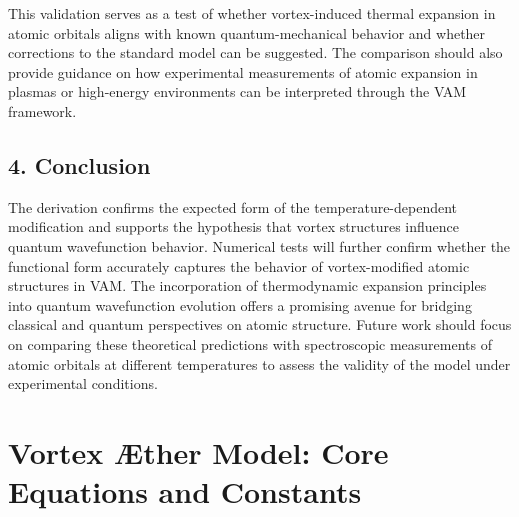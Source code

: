 \documentclass[a4paper,10pt]{article}
\begin{document}
This validation serves as a test of whether vortex-induced thermal expansion in atomic orbitals aligns with known quantum-mechanical behavior and whether corrections to the standard model can be suggested. The comparison should also provide guidance on how experimental measurements of atomic expansion in plasmas or high-energy environments can be interpreted through the VAM framework.

\subsection*{4. Conclusion}

The derivation confirms the expected form of the temperature-dependent modification and supports the hypothesis that vortex structures influence quantum wavefunction behavior. Numerical tests will further confirm whether the functional form accurately captures the behavior of vortex-modified atomic structures in VAM. The incorporation of thermodynamic expansion principles into quantum wavefunction evolution offers a promising avenue for bridging classical and quantum perspectives on atomic structure. Future work should focus on comparing these theoretical predictions with spectroscopic measurements of atomic orbitals at different temperatures to assess the validity of the model under experimental conditions.





\section*{Vortex Æther Model: Core Equations and Constants}
\end{document}
